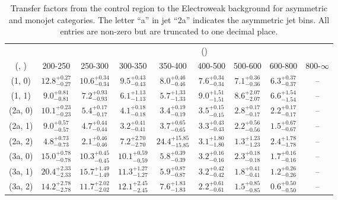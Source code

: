 \begin{table}[h!]
\tiny
\centering
\caption{Transfer factors from the \mmj control region to the Electroweak background for asymmetric and monojet categories. The letter ``a'' in jet \eg ``2a''  indicates the asymmetric jet bins. All entries are non-zero but are truncated to one decimal place.\label{tab:tf_total_mumu_asym}}
\begin{tabular}
{ccccccccc}
	\hline\hline
&	& \multicolumn{8}{c}{\scalht (\gev)} \\ 
	 (\njet,  \nb) & 200-250 & 250-300 & 300-350 & 350-400 & 400-500 & 500-600 & 600-800 & 800-$\infty$ \\ [0.8ex] 
\hline
	(1, 0) & $12.8^{+ 0.27 }_{- 0.27 }$ & $10.6^{+ 0.34 }_{- 0.34 }$ & $9.5^{+ 0.43 }_{- 0.43 }$ & $8.0^{+ 0.46 }_{- 0.46 }$ & $7.6^{+ 0.34 }_{- 0.34 }$ & $7.1^{+ 0.36 }_{- 0.36 }$ & $6.3^{+ 0.37 }_{- 0.37 }$ & -- \\[0.5ex] 
	(1, 1) & $9.0^{+ 0.81 }_{- 0.81 }$ & $7.2^{+ 0.93 }_{- 0.93 }$ & $6.1^{+ 1.13 }_{- 1.13 }$ & $5.7^{+ 1.33 }_{- 1.33 }$ & $9.0^{+ 1.51 }_{- 1.51 }$ & $8.6^{+ 2.07 }_{- 2.07 }$ & $6.6^{+ 1.54 }_{- 1.54 }$ & -- \\[0.5ex] 
	(2a, 0) & $10.1^{+ 0.23 }_{- 0.23 }$ & $5.4^{+ 0.17 }_{- 0.17 }$ & $4.1^{+ 0.18 }_{- 0.18 }$ & $3.4^{+ 0.19 }_{- 0.19 }$ & $3.5^{+ 0.15 }_{- 0.15 }$ & $2.8^{+ 0.17 }_{- 0.17 }$ & $2.2^{+ 0.17 }_{- 0.17 }$ & -- \\[0.5ex] 
	(2a, 1) & $9.0^{+ 0.57 }_{- 0.57 }$ & $4.7^{+ 0.44 }_{- 0.44 }$ & $3.2^{+ 0.41 }_{- 0.41 }$ & $3.7^{+ 0.65 }_{- 0.65 }$ & $3.3^{+ 0.43 }_{- 0.43 }$ & $2.2^{+ 0.56 }_{- 0.56 }$ & $1.5^{+ 0.67 }_{- 0.67 }$ & -- \\[0.5ex] 
	(2a, 2) & $4.8^{+ 0.73 }_{- 0.73 }$ & $2.1^{+ 0.46 }_{- 0.46 }$ & $7.2^{+ 2.70 }_{- 2.70 }$ & $24.4^{+ 15.85 }_{- 15.85 }$ & $3.1^{+ 1.80 }_{- 1.80 }$ & $1.3^{+ 1.23 }_{- 1.23 }$ & $2.4^{+ 1.78 }_{- 1.78 }$ & -- \\[0.5ex] 
	(3a, 0) & $15.0^{+ 0.78 }_{- 0.78 }$ & $10.3^{+ 0.45 }_{- 0.45 }$ & $10.1^{+ 0.59 }_{- 0.59 }$ & $5.8^{+ 0.39 }_{- 0.39 }$ & $3.2^{+ 0.16 }_{- 0.16 }$ & $2.3^{+ 0.18 }_{- 0.18 }$ & $1.7^{+ 0.16 }_{- 0.16 }$ & -- \\[0.5ex] 
	(3a, 1) & $20.4^{+ 2.33 }_{- 2.33 }$ & $15.7^{+ 1.49 }_{- 1.49 }$ & $11.3^{+ 1.27 }_{- 1.27 }$ & $5.9^{+ 0.87 }_{- 0.87 }$ & $3.2^{+ 0.42 }_{- 0.42 }$ & $1.8^{+ 0.41 }_{- 0.41 }$ & $1.2^{+ 0.26 }_{- 0.26 }$ & -- \\[0.5ex] 
	(3a, 2) & $14.2^{+ 2.78 }_{- 2.78 }$ & $11.7^{+ 2.02 }_{- 2.02 }$ & $12.1^{+ 2.45 }_{- 2.45 }$ & $7.6^{+ 1.83 }_{- 1.83 }$ & $2.2^{+ 0.61 }_{- 0.61 }$ & $1.5^{+ 0.85 }_{- 0.85 }$ & $0.6^{+ 0.50 }_{- 0.50 }$ & -- \\[0.5ex] 

\end{tabular}
\end{table}
